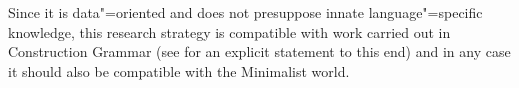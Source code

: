 Since it is data"=oriented and does not presuppose innate language"=specific knowledge, this research strategy is compatible with work carried out in Construction Grammar (see
 for an explicit statement to this end) and in any case it should also be compatible with the Minimalist
world.








